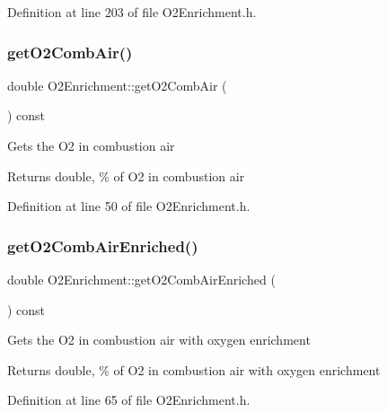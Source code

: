 Definition at line 203 of file O2\+Enrichment.\+h.

\mbox{\label{class_o2_enrichment_a52953d4a55fd9e4d91030fe96d800f71}} 
\subsubsection{\texorpdfstring{get\+O2\+Comb\+Air()}{getO2CombAir()}}
{\footnotesize\ttfamily double O2\+Enrichment\+::get\+O2\+Comb\+Air (\begin{DoxyParamCaption}{ }\end{DoxyParamCaption}) const\hspace{0.3cm}{\ttfamily [inline]}}

Gets the O2 in combustion air \begin{DoxyReturn}{Returns}
double, \% of O2 in combustion air 
\end{DoxyReturn}


Definition at line 50 of file O2\+Enrichment.\+h.

\mbox{\label{class_o2_enrichment_a0e9a9ec7987eaa673cb9527b293ded7c}} 
\subsubsection{\texorpdfstring{get\+O2\+Comb\+Air\+Enriched()}{getO2CombAirEnriched()}}
{\footnotesize\ttfamily double O2\+Enrichment\+::get\+O2\+Comb\+Air\+Enriched (\begin{DoxyParamCaption}{ }\end{DoxyParamCaption}) const\hspace{0.3cm}{\ttfamily [inline]}}

Gets the O2 in combustion air with oxygen enrichment \begin{DoxyReturn}{Returns}
double, \% of O2 in combustion air with oxygen enrichment 
\end{DoxyReturn}


Definition at line 65 of file O2\+Enrichment.\+h.

\mbox{\label{class_o2_enrichment_a1d31e1aef5f5a92f38c9a07216d0e539}} 
